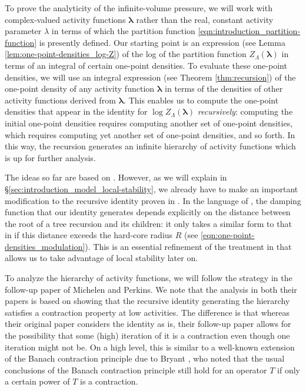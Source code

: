 \documentclass[11pt]{article}
\newcommand{\bl}{\bm{\lambda}}
\newcommand{\hcconst}{R}
\numberwithin{equation}{section}
\theoremstyle{plain}
\theoremstyle{definition}
\theoremstyle{remark}
\begin{document}
To prove the analyticity of the infinite-volume pressure, we will work with complex-valued activity functions $\bl$ rather than the real, constant activity parameter $\lambda$ in terms of which the partition function \eqref{eqn:introduction_partition-function} is presently defined.
Our starting point is an expression (see Lemma \ref{lem:one-point-densities_log-Z}) of the log of the partition function $Z_{\Lambda}(\bl)$ in terms of an integral of certain one-point densities.
To evaluate these one-point densities, we will use an integral expression (see Theorem \ref{thm:recursion}) of the one-point density of any activity function $\bl$ in terms of the densities of other activity functions derived from $\bl$.
This enables us to compute the one-point densities that appear in the identity for $\log Z_{\Lambda}(\bl)$ \emph{recursively}: computing the initial one-point densities requires computing another set of one-point densities, which requires computing yet another set of one-point densities, and so forth.
In this way, the recursion generates an infinite hierarchy of activity functions which is up for further analysis.

The ideas so far are based on \cite[\S2]{michelen2021potential}.
However, as we will explain in \S\ref{sec:introduction_model_local-stability}, we already have to make an important modification to the recursive identity proven in \cite[Theorem 8]{michelen2021potential}.
In the language of \cite[\S4.1]{michelen2023analyticity}, the damping function that our identity generates depends explicitly on the distance between the root of a tree recursion and its children: it only takes a similar form to that in \cite{michelen2021potential} if this distance exceeds the hard-core radius $\hcconst$ (see \eqref{eqn:one-point-densities_modulation}).
This is an essential refinement of the treatment in \cite{michelen2023analyticity} that allows us to take advantage of local stability later on.

To analyze the hierarchy of activity functions, we will follow the strategy in the follow-up paper \cite{michelen2023analyticity} of Michelen and Perkins.
We note that the analysis in both their papers is based on showing that the recursive identity generating the hierarchy satisfies a contraction property at low activities.
The difference is that whereas their original paper considers the identity as is, their follow-up paper allows for the possibility that some (high) iteration of it is a contraction even though one iteration might not be.
On a high level, this is similar to a well-known extension of the Banach contraction principle due to Bryant \cite{bryant1968remark}, who noted that the usual conclusions of the Banach contraction principle still hold for an operator $T$ if only a certain power of $T$ is a contraction.
\end{document}
